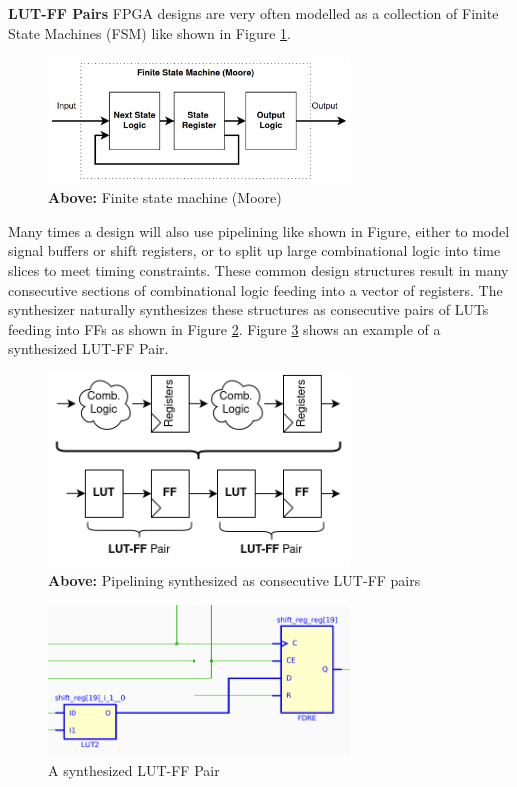 \documentclass[twocolumn]{article}
\begin{document}
    \textbf{LUT-FF Pairs} \quad
        FPGA designs are very often modelled as a collection of Finite State Machines (FSM) like shown in Figure \ref{fig:fsm}.
        \begin{figure}[]
            \centering
            \includegraphics[width=8.0cm]{figures/fsm.png}
            \caption{\textbf{Above:} Finite state machine (Moore)}
            \label{fig:fsm}
        \end{figure}
        Many times a design will also use pipelining like shown in Figure, either to model signal buffers or shift registers, or to split up large combinational logic into time slices to meet timing constraints. 
        These common design structures result in many consecutive sections of combinational logic feeding into a vector of registers. 
        The synthesizer naturally synthesizes these structures as consecutive pairs of LUTs feeding into FFs as shown in Figure \ref{fig:pipelining}. 
        Figure \ref{fig:lut_ff_pair} shows an example of a synthesized LUT-FF Pair. 
        \begin{figure}[]
            \centering
            \includegraphics[width=8.0cm]{figures/pipelining.png}
            \caption{\textbf{Above:} Pipelining synthesized as consecutive LUT-FF pairs}
            \label{fig:pipelining}
        \end{figure}

        \begin{figure}[]
            \centering
            \includegraphics[width=8.0cm]{figures/lut_ff_pair.png}
            \caption{A synthesized LUT-FF Pair}
            \label{fig:lut_ff_pair}
        \end{figure}
\end{document}
